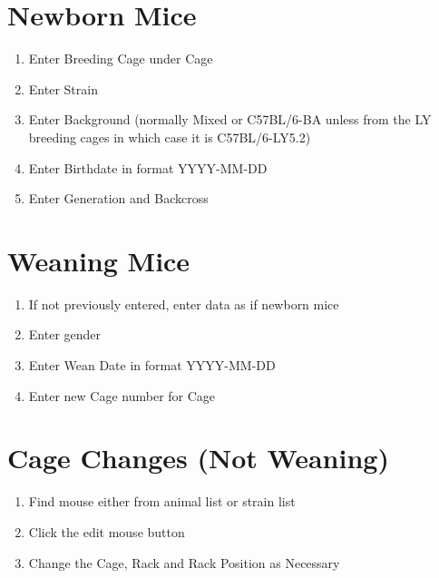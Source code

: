 \documentclass[letterpaper,10pt,english]{sphinxmanual}
\begin{document}
\section{Newborn Mice}
\label{usage:newborn-mice}\begin{enumerate}
\item {} 
Enter Breeding Cage under Cage

\item {} 
Enter Strain

\item {} 
Enter Background (normally Mixed or C57BL/6-BA unless from the LY breeding cages in which case it is C57BL/6-LY5.2)

\item {} 
Enter Birthdate in format YYYY-MM-DD

\item {} 
Enter Generation and Backcross

\end{enumerate}


\section{Weaning Mice}
\label{usage:weaning-mice}\begin{enumerate}
\item {} 
If not previously entered, enter data as if newborn mice

\item {} 
Enter gender

\item {} 
Enter Wean Date in format YYYY-MM-DD

\item {} 
Enter new Cage number for Cage

\end{enumerate}


\section{Cage Changes (Not Weaning)}
\label{usage:cage-changes-not-weaning}\begin{enumerate}
\item {} 
Find mouse either from animal list or strain list

\item {} 
Click the edit mouse button

\item {} 
Change the Cage, Rack and Rack Position as Necessary

\end{enumerate}
\end{document}
